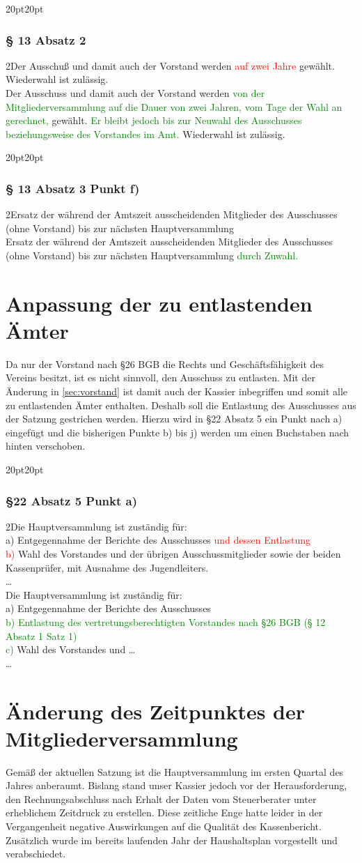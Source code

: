 \documentclass[10pt,a4paper,parskip=half]{scrartcl}
\newcommand{\new}[1]{\textcolor{Green}{#1}}
\newcommand{\old}[1]{\textcolor{Red}{#1}}
\newcommand{\change}[1]{
  \begin{adjustwidth}{20pt}{20pt}
    #1
  \end{adjustwidth}
}
\newcommand{\compare}[3]{\change{\subsubsection*{#1}\begin{multicols}{2}#2\columnbreak\\#3\end{multicols}}}
\begin{document}
  \compare{§ 13 Absatz 2}{Der Ausschuß und damit auch der Vorstand werden \old{auf zwei Jahre} gewählt. Wiederwahl ist zulässig.}{Der Ausschuss und damit auch der Vorstand werden \new{von der Mitgliederversammlung auf die Dauer von zwei Jahren,
  vom Tage der Wahl an gerechnet,} gewählt. \new{Er bleibt jedoch bis zur Neuwahl des Ausschusses beziehungsweise des Vorstandes im Amt.}
  Wiederwahl ist zulässig.}
  
  \compare{§ 13 Absatz 3 Punkt f)}{Ersatz der während der Amtszeit ausscheidenden Mitglieder des Ausschusses (ohne Vorstand) bis zur nächsten Hauptversammlung}{Ersatz der während der Amtszeit ausscheidenden Mitglieder des Ausschusses (ohne Vorstand) bis zur nächsten Hauptversammlung \new{durch Zuwahl.}}


  \clearpage
  \section{Anpassung der zu entlastenden Ämter}
  Da nur der Vorstand nach §26 BGB die Rechts und Geschäftsfähigkeit des Vereins besitzt, ist es nicht sinnvoll, den Ausschuss zu entlasten. Mit der Änderung in \autoref*{sec:vorstand} ist damit auch der Kassier inbegriffen und somit alle zu entlastenden Ämter enthalten. Deshalb soll die Entlastung des Ausschusses aus der Satzung gestrichen werden. Hierzu wird in §22 Absatz 5 ein Punkt nach a) eingefügt und die bisherigen Punkte b) bis j) werden um einen Buchstaben nach hinten verschoben.

  \compare{§22 Absatz 5 Punkt a)}
  {Die Hauptversammlung ist zuständig für: \\a) Entgegennahme der Berichte des Ausschusses \old{und dessen Entlastung}\\
  \old{b)} Wahl des Vorstandes und der übrigen Ausschussmitglieder sowie der beiden Kassenprüfer, mit Ausnahme des Jugendleiters.\\\dots}
  {Die Hauptversammlung ist zuständig für: \\a) Entgegennahme der Berichte des Ausschusses\\
  \new{b) Entlastung des vertretungsberechtigten Vorstandes nach §26 BGB (§ 12 Absatz 1 Satz 1)}\\
  \new{c)} Wahl des Vorstandes und \dots \\\dots}
  \clearpage
  \section{Änderung des Zeitpunktes der Mitgliederversammlung}
  Gemäß der aktuellen Satzung ist die Hauptversammlung im ersten Quartal des Jahres anberaumt. Bislang stand unser Kassier jedoch vor der Herausforderung, den Rechnungsabschluss nach Erhalt der Daten vom Steuerberater unter erheblichem Zeitdruck zu erstellen. Diese zeitliche Enge hatte leider in der Vergangenheit negative Auswirkungen auf die Qualität des Kassenbericht. Zusätzlich wurde im bereits laufenden Jahr der Haushaltsplan vorgestellt und verabschiedet.
  
\end{document}
